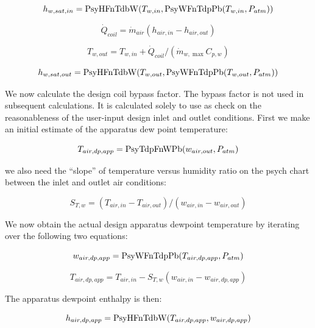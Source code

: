 \begin{equation}
{h_{w,sat,in}} = {\rm{PsyHFnTdbW}}({T_{w,in}},{\rm{PsyWFnTdpPb}}({T_{w,in}},{P_{atm}}))
\end{equation}

\begin{equation}
{\dot Q_{coil}} = {\dot m_{air}}({h_{air,in}} - {h_{air,out}})
\end{equation}

\begin{equation}
{T_{w,out}} = {T_{w,in}} + {\dot Q_{coil}}/({\dot m_{w,\max }}{C_{p,w}})
\end{equation}

\begin{equation}
{h_{w,sat,out}} = {\rm{PsyHFnTdbW}}({T_{w,out}},{\rm{PsyWFnTdpPb}}({T_{w,out}},{P_{atm}}))
\end{equation}

We now calculate the design coil bypass factor. The bypass factor is not used in subsequent calculations. It is calculated solely to use as check on the reasonableness of the user-input design inlet and outlet conditions. First we make an initial estimate of the apparatus dew point temperature:

\begin{equation}
{T_{air,dp,app}} = {\rm{PsyTdpFnWPb}}({w_{air,out}},{P_{atm}})
\end{equation}

we also need the ``slope'' of temperature versus humidity ratio on the psych chart between the inlet and outlet air conditions:

\begin{equation}
{S_{T,w}} = ({T_{air,in}} - {T_{air,out}})/({w_{air,in}} - {w_{air,out}})
\end{equation}

We now obtain the actual design apparatus dewpoint temperature by iterating over the following two equations:

\begin{equation}
{w_{air,dp,app}} = {\rm{PsyWFnTdpPb}}({T_{air,dp,app}},{P_{atm}})
\end{equation}

\begin{equation}
{T_{air,dp,app}} = {T_{air,in}} - {S_{T,w}}({w_{air,in}} - {w_{air,dp,app}})
\end{equation}

The apparatus dewpoint enthalpy is then:

\begin{equation}
{h_{air,dp,app}} = {\rm{PsyHFnTdbW}}({T_{air,dp,app}},{w_{air,dp,app}})
\end{equation}

